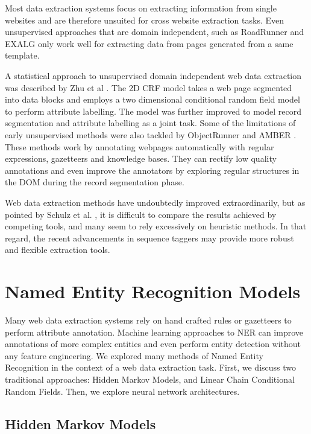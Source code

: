 \documentclass{nle}
\begin{document}
Most data extraction systems focus on extracting information from single websites
and are therefore unsuited for cross website extraction tasks. Even unsupervised
approaches that are domain independent, such as RoadRunner \cite{Crescenzi2001} 
and EXALG \cite{Arasu2003} only work well for extracting data from pages generated 
from a same template. 

A statistical approach to unsupervised domain 
independent web data extraction was described by Zhu et al \cite{Zhu2005}. The 2D CRF 
model takes a web page segmented into data blocks and employs a two dimensional conditional 
random field model to perform attribute labelling. The model was further improved
\cite{Zhu2006} to model record segmentation and attribute labelling as a joint task.
Some of the limitations of early unsupervised methods 
were also tackled by ObjectRunner \cite{Abdessalem2010} and AMBER \cite{Furche2012}. 
These methods work by annotating webpages automatically with regular expressions, gazetteers and 
knowledge bases. They can rectify low quality annotations and even improve the annotators
by exploring regular structures in the DOM during the record segmentation phase.

Web data extraction methods have undoubtedly improved extraordinarily, but
as pointed by Schulz et al. \cite{Schulz2016}, it is difficult to compare the results 
achieved by competing tools, and many seem to rely excessively on heuristic methods.
In that regard, the recent advancements in sequence taggers may provide more robust and
flexible extraction tools.

\section{Named Entity Recognition Models}

Many web data extraction systems rely on hand crafted rules or gazetteers to perform
attribute annotation. Machine learning approaches to NER can improve annotations of 
more complex entities and even perform entity detection without any feature
engineering. We explored many methods of Named Entity Recognition
in the context of a web data extraction task. First, we discuss two traditional 
approaches: Hidden Markov Models, and Linear Chain Conditional Random Fields. Then,
we explore neural network architectures.

\subsection{Hidden Markov Models}
\end{document}
